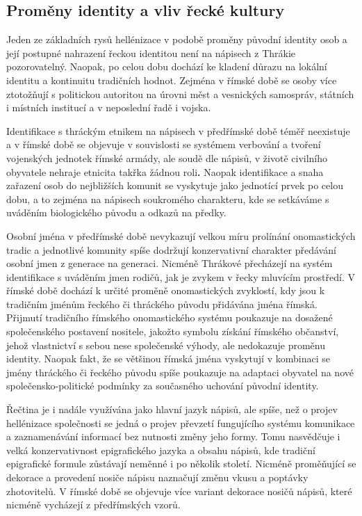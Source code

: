 \subsection[proměny-identity-a-vliv-řecké-kultury]{Proměny identity a vliv řecké kultury}

Jeden ze základních rysů hellénizace v podobě proměny původní identity osob a její postupné nahrazení řeckou identitou není na nápisech z Thrákie pozorovatelný. Naopak, po celou dobu dochází ke kladení důrazu na lokální identitu a kontinuitu tradičních hodnot. Zejména v římské době se osoby více ztotožňují s politickou autoritou na úrovni měst a vesnických samospráv, státních i místních institucí a v neposlední řadě i vojska.

Identifikace s thráckým etnikem na nápisech v předřímské době téměř neexistuje a v římské době se objevuje v souvislosti se systémem verbování a tvoření vojenských jednotek římské armády, ale soudě dle nápisů, v životě civilního obyvatele nehraje etnicita takřka žádnou roli{\bf .} Naopak identifikace a snaha zařazení osob do nejbližších komunit se vyskytuje jako jednotící prvek po celou dobu, a to zejména na nápisech soukromého charakteru, kde se setkáváme s uváděním biologického původu a odkazů na předky.

Osobní jména v předřímské době nevykazují velkou míru prolínání onomastických tradic a jednotlivé komunity spíše dodržují konzervativní charakter předávání osobní jmen z generace na generaci. Nicméně Thrákové přecházejí na systém identifikace s uváděním jmen rodičů, jak je zvykem v řecky mluvícím prostředí. V římské době dochází k určité proměně onomastických zvyklostí, kdy jsou k tradičním jménům řeckého či thráckého původu přidávána jména římská. Přijmutí tradičního římského onomastického systému poukazuje na dosažené společenského postavení nositele, jakožto symbolu získání římského občanství, jehož vlastnictví s sebou nese společenské výhody, ale nedokazuje proměnu identity. Naopak fakt, že se většinou římská jména vyskytují v kombinaci se jmény thráckého či řeckého původu spíše poukazuje na adaptaci obyvatel na nové společensko-politické podmínky za současného uchování původní identity.

Řečtina je i nadále využívána jako hlavní jazyk nápisů, ale spíše, než o projev hellénizace společnosti se jedná o projev převzetí fungujícího systému komunikace a zaznamenávání informací bez nutnosti změny jeho formy. Tomu nasvědčuje i velká konzervativnost epigrafického jazyka a obsahu nápisů, kde tradiční epigrafické formule zůstávají neměnné i po několik století. Nicméně proměňující se dekorace a provedení nosiče nápisu naznačují změnu vkusu a poptávky zhotovitelů. V římské době se objevuje více variant dekorace nosičů nápisů, které nicméně vycházejí z předřímských vzorů.

